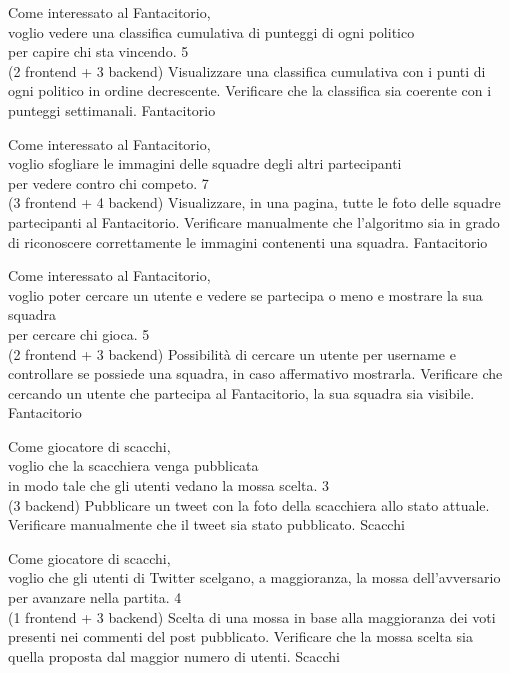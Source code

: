 \userstory%
{Come interessato al Fantacitorio,\\voglio vedere una classifica cumulativa di punteggi di ogni politico\\per capire chi sta vincendo.}%
{5\\(2 frontend + 3 backend)}%
{Visualizzare una classifica cumulativa con i punti di ogni politico in ordine decrescente.}%
{Verificare che la classifica sia coerente con i punteggi settimanali.}
{Fantacitorio}

\userstory%
{Come interessato al Fantacitorio,\\voglio sfogliare le immagini delle squadre degli altri partecipanti\\per vedere contro chi competo.}%
{7\\(3 frontend + 4 backend)}%
{Visualizzare, in una pagina, tutte le foto delle squadre partecipanti al Fantacitorio.}%
{Verificare manualmente che l'algoritmo sia in grado di riconoscere correttamente le immagini contenenti una squadra.}
{Fantacitorio}

\userstory%
{Come interessato al Fantacitorio,\\voglio poter cercare un utente e vedere se partecipa o meno e mostrare la sua squadra\\per cercare chi gioca.}%
{5\\(2 frontend + 3 backend)}%
{Possibilità di cercare un utente per username e controllare se possiede una squadra, in caso affermativo mostrarla.}%
{Verificare che cercando un utente che partecipa al Fantacitorio, la sua squadra sia visibile.}
{Fantacitorio}

\userstory%
{Come giocatore di scacchi,\\voglio che la scacchiera venga pubblicata\\in modo tale che gli utenti vedano la mossa scelta.}%
{3\\(3 backend)}%
{Pubblicare un tweet con la foto della scacchiera allo stato attuale.}%
{Verificare manualmente che il tweet sia stato pubblicato.}
{Scacchi}

\userstory%
{Come giocatore di scacchi,\\voglio che gli utenti di Twitter scelgano, a maggioranza, la mossa dell'avversario\\per avanzare nella partita.}%
{4\\(1 frontend + 3 backend)}%
{Scelta di una mossa in base alla maggioranza dei voti presenti nei commenti del post pubblicato.}%
{Verificare che la mossa scelta sia quella proposta dal maggior numero di utenti.}
{Scacchi}

